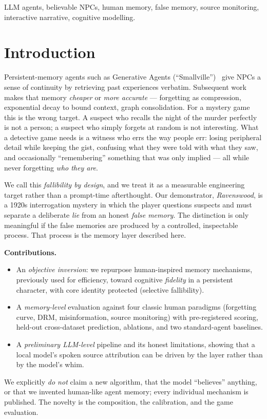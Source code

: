 \documentclass[conference]{IEEEtran}
\begin{document}
\begin{IEEEkeywords}
LLM agents, believable NPCs, human memory, false memory, source monitoring,
interactive narrative, cognitive modelling.
\end{IEEEkeywords}

\section{Introduction}
Persistent-memory agents such as Generative Agents (``Smallville'')~\cite{park2023}
give NPCs a sense of continuity by retrieving past experiences verbatim.
Subsequent work makes that memory \emph{cheaper} or \emph{more accurate} ---
forgetting as compression, exponential decay to bound context, graph
consolidation. For a mystery game this is the wrong target. A suspect who recalls
the night of the murder perfectly is not a person; a suspect who simply forgets at
random is not interesting. What a detective game needs is a witness who errs the
way people err: losing peripheral detail while keeping the gist, confusing what
they were told with what they saw, and occasionally ``remembering'' something that
was only implied --- all while never forgetting \emph{who they are}.

We call this \emph{fallibility by design}, and we treat it as a measurable
engineering target rather than a prompt-time afterthought. Our demonstrator,
\emph{Ravenswood}, is a 1920s interrogation mystery in which the player questions
suspects and must separate a deliberate \emph{lie} from an honest \emph{false
memory}. The distinction is only meaningful if the false memories are produced by
a controlled, inspectable process. That process is the memory layer described
here.

\textbf{Contributions.}
\begin{itemize}
\item An \emph{objective inversion}: we repurpose human-inspired memory
mechanisms, previously used for efficiency, toward cognitive \emph{fidelity} in a
persistent character, with core identity protected (selective fallibility).
\item A \emph{memory-level} evaluation against four classic human paradigms
(forgetting curve, DRM, misinformation, source monitoring) with pre-registered
scoring, held-out cross-dataset prediction, ablations, and two standard-agent
baselines.
\item A \emph{preliminary LLM-level} pipeline and its honest limitations, showing
that a local model's spoken source attribution can be driven by the layer rather
than by the model's whim.
\end{itemize}
We explicitly \emph{do not} claim a new algorithm, that the model ``believes''
anything, or that we invented human-like agent memory; every individual mechanism
is published. The novelty is the composition, the calibration, and the game
evaluation.
\end{document}
